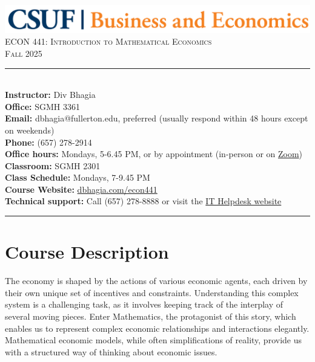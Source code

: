 \documentclass{./../Latex/syllabus}
\begin{document}
\begin{center}
\includegraphics[scale=0.22]{CBE-Wordmark-CMYK} \\ \vspace{0.5em}
{\large \textsc{ECON 441: Introduction to Mathematical Economics}} \\
{\large \textsc{Fall 2025}}
\end{center}

\begin{center}
\begin{minipage}[t]{\textwidth}
\rule{\textwidth}{0.5pt} \\
\textbf{Instructor:} Div Bhagia \\
\textbf{Office:} SGMH 3361 \\
\textbf{Email:} dbhagia@fullerton.edu, preferred (usually respond within 48 hours except on weekends) \\
\textbf{Phone:} (657) 278-2914 \\
\textbf{Office hours:} Mondays, 5-6.45 PM, or by appointment (in-person or on \href{https://fullerton.zoom.us/j/81895171931}{Zoom}) \\
\textbf{Classroom:} SGMH 2301 \\
\textbf{Class Schedule:} Mondays, 7-9.45 PM \\
\textbf{Course Website:} \href{https://dbhagia.com/econ441}{dbhagia.com/econ441} \\
\textbf{Technical support:} Call (657) 278-8888 or visit the \href{https://www.fullerton.edu/it/students/helpdesk/index.php}{IT Helpdesk website} \\
\rule{\textwidth}{0.5pt} 
\end{minipage}
\end{center}

\vspace{0.1em}
\section*{Course Description}


The economy is shaped by the actions of various economic agents, each driven by their own unique set of incentives and constraints. Understanding this complex system is a challenging task, as it involves keeping track of the interplay of several moving pieces. Enter Mathematics, the protagonist of this story, which enables us to represent complex economic relationships and interactions elegantly. Mathematical economic models, while often simplifications of reality, provide us with a structured way of thinking about economic issues.
\end{document}
